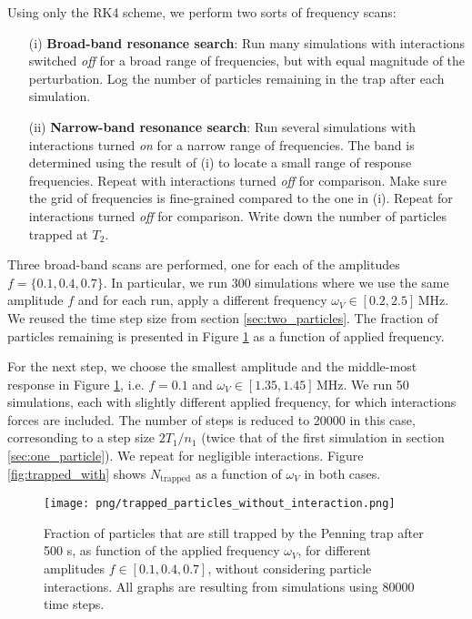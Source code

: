 Using only the RK4 scheme, we perform two sorts of frequency scans:


\begin{itemize} %
    \item[(i)] \textbf{Broad-band resonance search}: Run many simulations with interactions switched \textit{off} for a broad range of frequencies, but with equal magnitude of the perturbation. Log the number of particles remaining in the trap after each simulation.
    \item[(ii)] \textbf{Narrow-band resonance search}: Run several simulations with interactions turned \textit{on} for a narrow range of frequencies. The band is determined using the result of (i) to locate a small range of response frequencies. Repeat with interactions turned \textit{off} for comparison. Make sure the grid of frequencies is fine-grained compared to the one in (i).  Repeat for interactions turned \textit{off} for comparison. Write down the number of particles trapped at $T_2$.
\end{itemize}

Three broad-band scans are performed, one for each of the amplitudes $f=\{0.1, 0.4, 0.7\}$. In particular, we run 300 simulations where we use the same amplitude $f$ and for each run, apply a different frequency $\omega_V \in[0.2,2.5] \,\mathrm{MHz}$. We reused the time step size from section \ref{sec:two_particles}. The fraction of particles remaining is presented in Figure \ref{fig:trapped_without} as a function of applied frequency. 

For the next step, we choose the smallest amplitude and the middle-most  response in Figure \ref{fig:trapped_without}, i.e. $f=0.1$ and $\omega_V \in[1.35,1.45] \,\mathrm{MHz}$. We run 50 simulations, each with slightly different applied frequency, for which interactions forces are included. The number of steps is reduced to 20000 in this case, corresonding to a step size $2 T_1/n_1$ (twice that of the first simulation in section \ref{sec:one_particle}). We repeat for negligible interactions. Figure \ref{fig:trapped_with} shows $N_\mathrm{trapped}$ as a function of $\omega_V$ in both cases.


\begin{figure}
    \texttt{[image: png/trapped\_particles\_without\_interaction.png]}
    \caption{Fraction of particles that are still trapped by the Penning trap after 500 \textmu s, as function of the applied frequency $\omega_V$, for different amplitudes $f\in[0.1, 0.4, 0.7]$, without considering particle interactions. All graphs are resulting from simulations using 80000 time steps.}
    \label{fig:trapped_without}
\end{figure}

